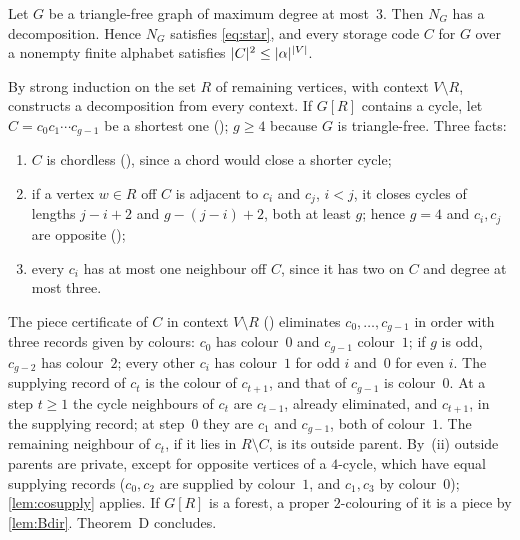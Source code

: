 \begin{theorem}[Theorem N3]\label{thm:N3}
Let $G$ be a triangle-free graph of maximum degree at most~$3$. Then $N_G$ has a decomposition. Hence $N_G$ satisfies
\eqref{eq:star}, and every storage code $C$ for $G$ over a nonempty finite alphabet satisfies
$\lvert C \rvert^2\le\lvert \alpha \rvert^{\lvert V \rvert}$.
\end{theorem}

\begin{outline}
By strong induction on the set $R$ of remaining vertices, with context $V\setminus R$, 
constructs a decomposition from every context. If $G[R]$ contains a cycle, let $C=c_0c_1\cdots c_{g-1}$ be a shortest one
(); $g\ge4$ because $G$ is triangle-free. Three facts:
\begin{enumerate}[label=(\roman*)]
\item $C$ is chordless (), since a chord would close a shorter cycle;
\item if a vertex $w\in R$ off $C$ is adjacent to $c_i$ and $c_j$, $i<j$, it closes cycles of lengths $j-i+2$ and
$g-(j-i)+2$, both at least $g$; hence $g=4$ and $c_i,c_j$ are opposite ();
\item every $c_i$ has at most one neighbour off $C$, since it has two on $C$ and degree at most three.
\end{enumerate}
The piece certificate of $C$ in context $V\setminus R$ () eliminates $c_0,\dots,c_{g-1}$ in order with
three records given by colours: $c_0$ has colour~$0$ and $c_{g-1}$ colour~$1$; if $g$ is odd, $c_{g-2}$ has
colour~$2$; every other $c_i$ has colour~$1$ for odd $i$ and~$0$ for even $i$. The supplying record of $c_t$ is the
colour of $c_{t+1}$, and that of $c_{g-1}$ is colour~$0$. At a step $t\ge1$ the cycle neighbours of $c_t$ are
$c_{t-1}$, already eliminated, and $c_{t+1}$, in the supplying record; at step~$0$ they are $c_1$ and $c_{g-1}$, both of
colour~$1$. The remaining neighbour of $c_t$, if it lies in $R\setminus C$, is its outside parent. By~(ii) outside
parents are private, except for opposite vertices of a $4$-cycle, which have equal supplying records ($c_0,c_2$ are
supplied by colour~$1$, and $c_1,c_3$ by colour~$0$); \cref{lem:cosupply} applies. If $G[R]$ is a forest, a proper
$2$-colouring of it is a piece by \cref{lem:Bdir}. Theorem~D concludes.
\end{outline}

